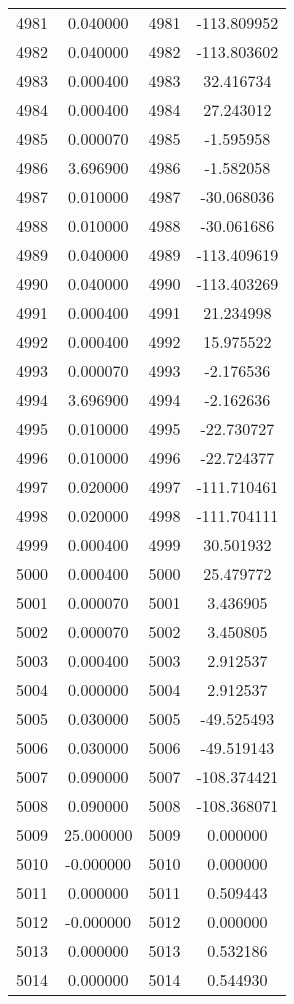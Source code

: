 \documentclass[12pt]{article}
\begin{document}
\begin{longtable}{@{}cccc@{}}
4981 & 0.040000 & 4981 & -113.809952 \\
4982 & 0.040000 & 4982 & -113.803602 \\
4983 & 0.000400 & 4983 & 32.416734 \\
4984 & 0.000400 & 4984 & 27.243012 \\
4985 & 0.000070 & 4985 & -1.595958 \\
4986 & 3.696900 & 4986 & -1.582058 \\
4987 & 0.010000 & 4987 & -30.068036 \\
4988 & 0.010000 & 4988 & -30.061686 \\
4989 & 0.040000 & 4989 & -113.409619 \\
4990 & 0.040000 & 4990 & -113.403269 \\
4991 & 0.000400 & 4991 & 21.234998 \\
4992 & 0.000400 & 4992 & 15.975522 \\
4993 & 0.000070 & 4993 & -2.176536 \\
4994 & 3.696900 & 4994 & -2.162636 \\
4995 & 0.010000 & 4995 & -22.730727 \\
4996 & 0.010000 & 4996 & -22.724377 \\
4997 & 0.020000 & 4997 & -111.710461 \\
4998 & 0.020000 & 4998 & -111.704111 \\
4999 & 0.000400 & 4999 & 30.501932 \\
5000 & 0.000400 & 5000 & 25.479772 \\
5001 & 0.000070 & 5001 & 3.436905 \\
5002 & 0.000070 & 5002 & 3.450805 \\
5003 & 0.000400 & 5003 & 2.912537 \\
5004 & 0.000000 & 5004 & 2.912537 \\
5005 & 0.030000 & 5005 & -49.525493 \\
5006 & 0.030000 & 5006 & -49.519143 \\
5007 & 0.090000 & 5007 & -108.374421 \\
5008 & 0.090000 & 5008 & -108.368071 \\
5009 & 25.000000 & 5009 & 0.000000 \\
5010 & -0.000000 & 5010 & 0.000000 \\
5011 & 0.000000 & 5011 & 0.509443 \\
5012 & -0.000000 & 5012 & 0.000000 \\
5013 & 0.000000 & 5013 & 0.532186 \\
5014 & 0.000000 & 5014 & 0.544930 \\

\end{longtable}
\end{document}
